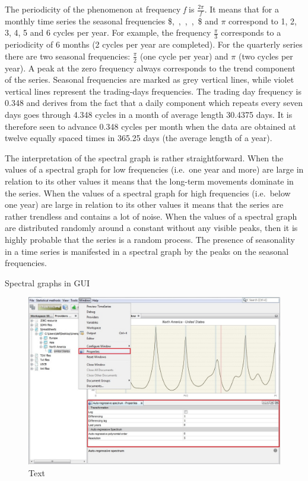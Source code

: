 \documentclass[
  letterpaper,
  DIV=11,
  numbers=noendperiod]{scrreprt}
\begin{document}
The periodicity of the phenomenon at frequency \emph{f} is
\(\frac{2\pi}{f}\). It means that for a monthly time series the seasonal
frequencies
\$,~,~,~,~\$
and \(\pi\) correspond to 1, 2, 3, 4, 5 and 6 cycles per year. For
example, the frequency \(\frac{\pi}{3}\) corresponds to a periodicity of
6 months (2 cycles per year are completed). For the quarterly series
there are two seasonal frequencies: \(\frac{\pi}{2}\) (one cycle per
year) and \(\pi\) (two cycles per year). A peak at the zero frequency
always corresponds to the trend component of the series. Seasonal
frequencies are marked as grey vertical lines, while violet vertical
lines represent the trading-days frequencies. The trading day frequency
is 0.348 and derives from the fact that a daily component which repeats
every seven days goes through 4.348 cycles in a month of average length
30.4375 days. It is therefore seen to advance 0.348 cycles per month
when the data are obtained at twelve equally spaced times in 365.25 days
(the average length of a year).

The interpretation of the spectral graph is rather straightforward. When
the values of a spectral graph for low frequencies (i.e.~one year and
more) are large in relation to its other values it means that the
long-term movements dominate in the series. When the values of a
spectral graph for high frequencies (i.e.~below one year) are large in
relation to its other values it means that the series are rather
trendless and contains a lot of noise. When the values of a spectral
graph are distributed randomly around a constant without any visible
peaks, then it is highly probable that the series is a random process.
The presence of seasonality in a time series is manifested in a spectral
graph by the peaks on the seasonal frequencies.

Spectral graphs in GUI

\begin{figure}

{\centering \includegraphics{./All_images/image3_342.jpeg}

}

\caption{Text}

\end{figure}
\end{document}
